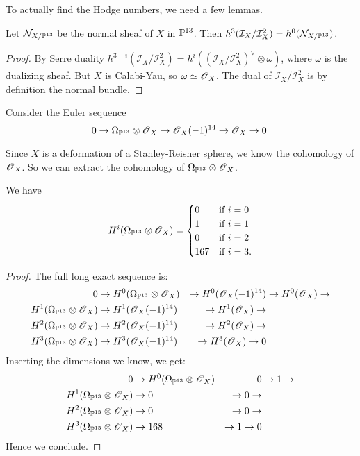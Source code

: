 \documentclass[11pt, english]{article}
\begin{document}
\begin{thm}
To actually find the Hodge numbers, we need a few lemmas.

\begin{lemma}
\label{lemmanormal}
Let $\mathcal N_{X/\mathbb{P}^{13}}$ be the normal sheaf of $X$ in $\mathbb{P}^{13}$. Then $h^3(\mathcal I_X/\mathcal I_X^2) = h^0(\mathcal N_{X/\mathbb{P}^{13}})$.
\end{lemma}
\begin{proof}
By Serre duality $h^{3-i}(\mathcal I_X/\mathcal I_X^2)=h^{i}((\mathcal I_X/\mathcal I_X^2)^\vee \otimes \omega)$, where $\omega$ is the dualizing sheaf. But $X$ is Calabi-Yau, so $\omega \simeq \operatorname{\mathscr{O}}_X$. The dual of $\mathcal I_X/\mathcal I_X^2$ is by definition the normal bundle.
\end{proof}

Consider the Euler sequence
\[
0 \to \Omega_{\mathbb{P}^{13}} \otimes \operatorname{\mathscr{O}}_{X} \to \operatorname{\mathscr{O}}_{X}(-1)^{14} \to \operatorname{\mathscr{O}}_X \to 0.
\]

Since $X$ is a deformation of a Stanley-Reisner sphere, we know the cohomology of $\operatorname{\mathscr{O}}_X$. So we can extract the cohomology of $\Omega_{\mathbb{P}^{13}} \otimes \operatorname{\mathscr{O}}_X$.

\begin{lemma}
We have
\[
H^i(\Omega_{\mathbb{P}^{13}} \otimes \operatorname{\mathscr{O}}_X) = \begin{cases}
0 & \text{if } i=0 \\
1 & \text{if } i=1 \\
0 & \text{if } i=2 \\
167 & \text{if } i=3. \\
\end{cases}
\]
\end{lemma}
\begin{proof}
The full long exact sequence is:
\begin{align*}
0 & \to H^0(\Omega_{\mathbb{P}^{13}} \otimes \operatorname{\mathscr{O}}_X) &\to H^0(\operatorname{\mathscr{O}}_X(-1)^{14}) &\to H^0(\operatorname{\mathscr{O}}_X) \to \\
H^1(\Omega_{\mathbb{P}^{13}} \otimes \operatorname{\mathscr{O}}_X) &\to H^1(\operatorname{\mathscr{O}}_X(-1)^{14}) &\to H^1(\operatorname{\mathscr{O}}_X) \to \\
 H^2(\Omega_{\mathbb{P}^{13}} \otimes \operatorname{\mathscr{O}}_X) &\to H^2(\operatorname{\mathscr{O}}_X(-1)^{14}) &\to H^2(\operatorname{\mathscr{O}}_X) \to \\
 H^3(\Omega_{\mathbb{P}^{13}} \otimes \operatorname{\mathscr{O}}_X) &\to H^3(\operatorname{\mathscr{O}}_X(-1)^{14}) &\to H^3(\operatorname{\mathscr{O}}_X) \to 0
\end{align*}
Inserting the dimensions we know, we get:
\begin{align*}
0 & \to H^0(\Omega_{\mathbb{P}^{13}} \otimes \operatorname{\mathscr{O}}_X) & 0  &\to 1 \to \\
H^1(\Omega_{\mathbb{P}^{13}} \otimes \operatorname{\mathscr{O}}_X) &\to 0 &\to 0 \to \\
 H^2(\Omega_{\mathbb{P}^{13}} \otimes \operatorname{\mathscr{O}}_X) &\to 0 &\to 0 \to \\
 H^3(\Omega_{\mathbb{P}^{13}} \otimes \operatorname{\mathscr{O}}_X) &\to 168  &\to 1 \to 0
\end{align*}
Hence we conclude.
\end{proof}


\end{thm}
\end{document}
